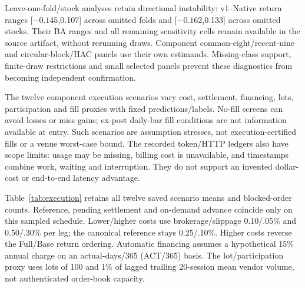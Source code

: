 Leave-one-fold/stock analyses retain directional instability: v1--Native
return ranges [$-0.145$,0.107] across omitted folds and [$-0.162$,0.133]
across omitted stocks. Their BA ranges and all remaining sensitivity
cells remain available in the source artifact, without rerunning draws.
Component common-eight/recent-nine and circular-block/HAC panels use
their own estimands. Missing-class support, finite-draw restrictions and
small selected panels prevent these diagnostics from becoming independent
confirmation.

The twelve component execution scenarios vary cost, settlement, financing,
lots, participation and fill proxies with fixed predictions/labels.
No-fill screens can avoid losses or miss gains; ex-post daily-bar fill
conditions are not information available at entry. Such scenarios are
assumption stresses, not execution-certified fills or a venue worst-case
bound. The recorded token/HTTP ledgers also have scope limits: usage
may be missing, billing cost is unavailable, and timestamps combine work,
waiting and interruption. They do not support an invented dollar-cost
or end-to-end latency advantage.


Table~\ref{tab:execution} retains all twelve saved scenario means and
blocked-order counts. Reference, pending settlement and on-demand
advance coincide only on this sampled schedule. Lower/higher costs use
brokerage/slippage 0.10/.05\% and 0.50/.30\% per leg; the canonical reference
stays 0.25/.10\%. Higher costs reverse the Full/Base return ordering.
Automatic financing assumes a hypothetical 15\% annual charge on an
actual-days/365 (ACT/365) basis.
The lot/participation proxy uses lots of 100 and 1\% of lagged trailing
20-session mean vendor volume, not authenticated order-book capacity.


